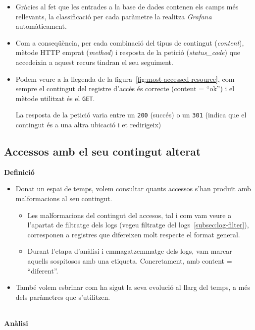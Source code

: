 \begin{itemize}
    \item Gràcies al fet que les entrades a la base de dades contenen els camps més rellevants, la classificació per cada paràmetre la realitza \textit{Grafana} automàticament.
    \item Com a conseqüència, per cada combinació del tipus de contingut (\textit{content}), mètode \gls{HTTP} emprat (\textit{method}) i resposta de la petició (\textit{status\_code}) que accedeixin a aquest recurs tindran el seu seguiment.
    \item Podem veure a la llegenda de la figura~\ref{fig:most-accessed-resource}, com sempre el contingut del registre d'accés és correcte (content = “ok”) i el mètode utilitzat és el \texttt{GET}.

    La resposta de la petició varia entre un \texttt{200} (succés) o un \texttt{301} (indica que el contingut és a una altra ubicació i et redirigeix)
\end{itemize}

\clearpage
\subsection{Accessos amb el seu contingut alterat}\label{subsec:content-altered-acces}

\textbf{Definició}

\begin{itemize}
    \item Donat un espai de temps, volem consultar quants accessos s'han produït amb malformacions al seu contingut.

    \begin{itemize}
        \item Les malformacions del contingut del accesos, tal i com vam veure a l'apartat de filtratge dels logs (vegeu filtratge del logs~\ref{subsec:log-filter}), corresponen a registres que difereixen molt respecte el format general.
        \item Durant l'etapa d'anàlisi i emmagatzemmatge dels logs, vam marcar aquells sospitosos amb una etiqueta.
        Concretament, amb content = “diferent”.
    \end{itemize}

    \item També volem esbrinar com ha sigut la seva evolució al llarg del temps, a més dels paràmetres que s'utilitzen.
\end{itemize}

\noindent \\
\textbf{Anàlisi}

